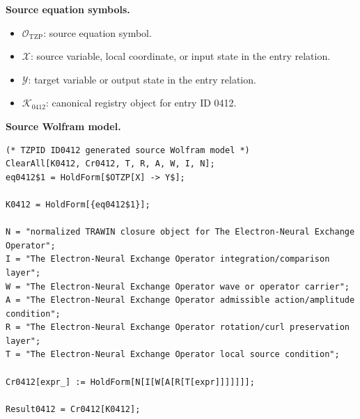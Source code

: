 \begin{minipage}[t]{0.49\linewidth}
\begingroup
\small
\raggedright
\textbf{Source equation symbols.}\par
\begin{itemize}[leftmargin=1.35em,itemsep=1pt,topsep=1pt,parsep=0pt]
    \item $\mathcal{O}_{\mathrm{TZP}}$: source equation symbol.
    \item $\mathcal{X}$: source variable, local coordinate, or input state in the entry relation.
    \item $\mathcal{Y}$: target variable or output state in the entry relation.
    \item $\mathcal{K}_{0412}$: canonical registry object for entry ID 0412.
\end{itemize}
\endgroup
\end{minipage}\hfill
\begin{minipage}[t]{0.47\linewidth}
\begingroup
\scriptsize
\raggedright
\textbf{Source Wolfram model.}\par
\begin{Verbatim}[fontsize=\tiny,breaklines=true,breakanywhere=true]
(* TZPID ID0412 generated source Wolfram model *)
ClearAll[K0412, Cr0412, T, R, A, W, I, N];
eq0412$1 = HoldForm[$OTZP[X] -> Y$];

K0412 = HoldForm[{eq0412$1}];

N = "normalized TRAWIN closure object for The Electron-Neural Exchange Operator";
I = "The Electron-Neural Exchange Operator integration/comparison layer";
W = "The Electron-Neural Exchange Operator wave or operator carrier";
A = "The Electron-Neural Exchange Operator admissible action/amplitude condition";
R = "The Electron-Neural Exchange Operator rotation/curl preservation layer";
T = "The Electron-Neural Exchange Operator local source condition";

Cr0412[expr_] := HoldForm[N[I[W[A[R[T[expr]]]]]]];

Result0412 = Cr0412[K0412];
\end{Verbatim}
\endgroup
\end{minipage}

